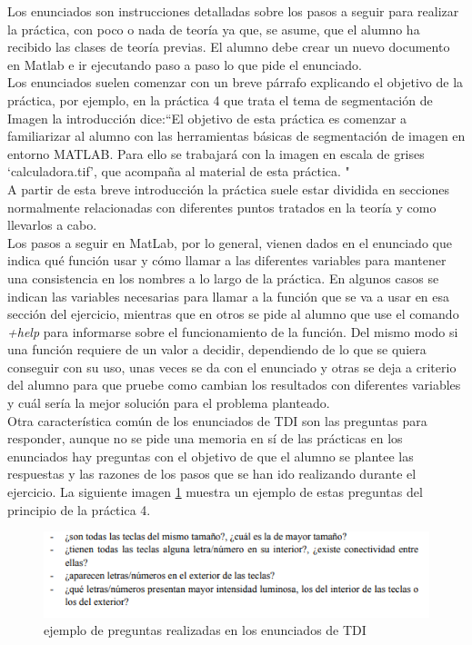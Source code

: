 \documentclass[a4paper,12pt]{report}
\begin{document}
Los enunciados son instrucciones detalladas sobre los pasos a seguir para realizar la práctica, con poco o nada de teoría ya que, se asume, que el alumno ha recibido las clases de teoría previas. El alumno debe crear un nuevo documento en Matlab e ir ejecutando paso a paso lo que pide el enunciado. \\

Los enunciados suelen comenzar con un breve párrafo explicando el objetivo de la práctica, por ejemplo, en la práctica 4 que trata el tema de segmentación de Imagen la introducción dice:``El objetivo de esta práctica es comenzar a familiarizar al alumno con las herramientas básicas de segmentación de imagen en entorno MATLAB. Para ello se trabajará con la imagen en escala de
grises ‘calculadora.tif’, que acompaña al material de esta práctica. "\\

A partir de esta breve introducción la práctica suele estar dividida en secciones normalmente relacionadas con diferentes puntos tratados en la teoría y como llevarlos a cabo.\\

Los pasos a seguir en MatLab, por lo general, vienen dados en el enunciado que indica qué función usar y cómo llamar a las diferentes variables para mantener una consistencia en los nombres a lo largo de la práctica. En algunos casos se indican las variables necesarias para llamar a la función que se va a usar en esa sección del ejercicio, mientras que en otros se pide al alumno que use el comando \textsl{+help} para informarse sobre el funcionamiento de la función. Del mismo modo si una función requiere de un valor a decidir, dependiendo de lo que se quiera conseguir con su uso, unas veces se da con el enunciado y otras se deja a criterio del alumno para que pruebe como cambian los resultados con diferentes variables y cuál sería la mejor solución para el problema planteado.\\

Otra característica común de los enunciados de TDI son las preguntas para responder, aunque no se pide una memoria en sí de las prácticas en los enunciados hay preguntas con el objetivo de que el alumno se plantee las respuestas y las razones de los pasos que se han ido realizando durante el ejercicio.  La siguiente imagen \ref{preguntasp4} muestra un ejemplo de estas preguntas del principio de la práctica 4.

\begin{figure}[h]
\centering
\includegraphics[width=1\textwidth]{imagenes/preguntasp4}
\caption{ejemplo de preguntas realizadas en los enunciados de TDI}
\label{preguntasp4}
\end{figure}
\end{document}
